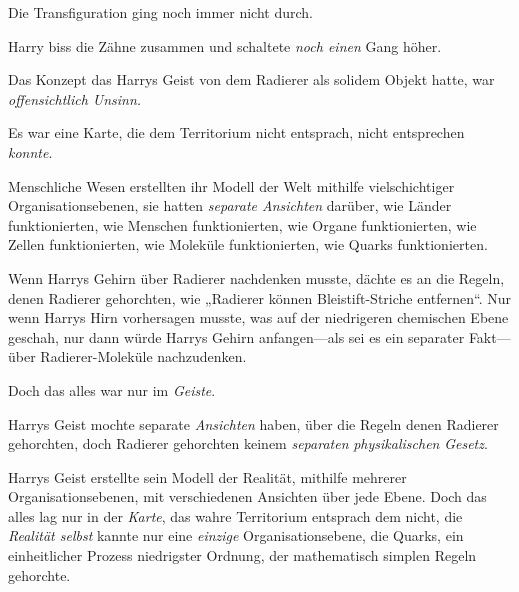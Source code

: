Die Transfiguration ging noch immer nicht durch.

Harry biss die Zähne zusammen und schaltete \emph{noch einen} Gang höher.

Das Konzept das Harrys Geist von dem Radierer als solidem Objekt hatte, war \emph{offensichtlich Unsinn.}

Es war eine Karte, die dem Territorium nicht entsprach, nicht entsprechen \emph{konnte}.

Menschliche Wesen erstellten ihr Modell der Welt mithilfe vielschichtiger Organisationsebenen, sie hatten \emph{separate Ansichten} darüber, wie Länder funktionierten, wie Menschen funktionierten, wie Organe funktionierten, wie Zellen funktionierten, wie Moleküle funktionierten, wie Quarks funktionierten.

Wenn Harrys Gehirn über Radierer nachdenken musste, dächte es an die Regeln, denen Radierer gehorchten, wie „Radierer können Bleistift-Striche entfernen“. Nur wenn Harrys Hirn vorhersagen musste, was auf der niedrigeren chemischen Ebene geschah, nur dann würde Harrys Gehirn anfangen—als sei es ein separater Fakt—über Radierer-Moleküle nachzudenken.

Doch das alles war nur im \emph{Geiste}.

Harrys Geist mochte separate \emph{Ansichten} haben, über die Regeln denen Radierer gehorchten, doch Radierer gehorchten keinem \emph{separaten} \emph{physikalischen} \emph{Gesetz}.

Harrys Geist erstellte sein Modell der Realität, mithilfe mehrerer Organisationsebenen, mit verschiedenen Ansichten über jede Ebene. Doch das alles lag nur in der \emph{Karte}, das wahre Territorium entsprach dem nicht, die \emph{Realität selbst} kannte nur eine \emph{einzige} Organisationsebene, die Quarks, ein einheitlicher Prozess niedrigster Ordnung, der mathematisch simplen Regeln gehorchte.

